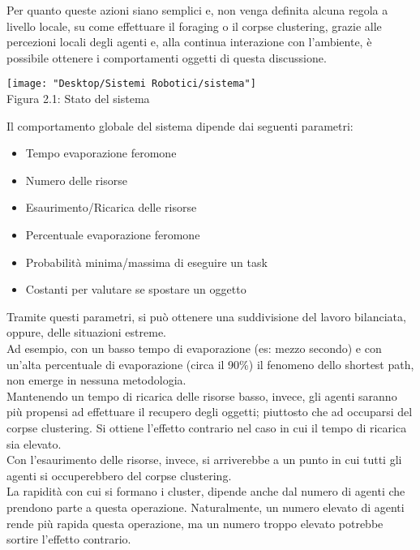 \documentclass[12pt,a4paper,openright,twoside]{report}
\begin{document}
Per quanto queste azioni siano semplici e, non venga definita alcuna regola a livello locale, su come effettuare il foraging o il corpse clustering, grazie alle percezioni locali degli agenti e, alla continua interazione con l'ambiente, è possibile ottenere i comportamenti oggetti di questa discussione.\\

\begin{center}  
	\texttt{[image: "Desktop/Sistemi Robotici/sistema"]}
	\\Figura 2.1: Stato del sistema
\end{center}

Il comportamento globale del sistema dipende dai seguenti parametri:\\
\begin{itemize}
	\item Tempo evaporazione feromone
	\item Numero delle risorse
	\item Esaurimento/Ricarica delle risorse
	\item Percentuale evaporazione feromone
	\item Probabilità minima/massima di eseguire un task
	\item Costanti per valutare se spostare un oggetto
\end{itemize}

Tramite questi parametri, si può ottenere una suddivisione del lavoro bilanciata, oppure, delle situazioni estreme.\\
Ad esempio, con un basso tempo di evaporazione (es: mezzo secondo) e con un'alta percentuale di evaporazione (circa il 90\%) il fenomeno dello shortest path, non emerge in nessuna metodologia.\\
Mantenendo un tempo di ricarica delle risorse basso, invece, gli agenti saranno più propensi ad effettuare il recupero degli oggetti; piuttosto che ad occuparsi del corpse clustering. Si ottiene l'effetto contrario nel caso in cui il tempo di ricarica sia elevato.\\Con l'esaurimento delle risorse, invece, si arriverebbe a un punto in cui tutti gli agenti si occuperebbero del corpse clustering.\\
La rapidità con cui si formano i cluster, dipende anche dal numero di agenti che prendono parte a questa operazione. Naturalmente, un numero elevato di agenti rende più rapida questa operazione, ma un numero troppo elevato potrebbe sortire l'effetto contrario.\\
\end{document}
